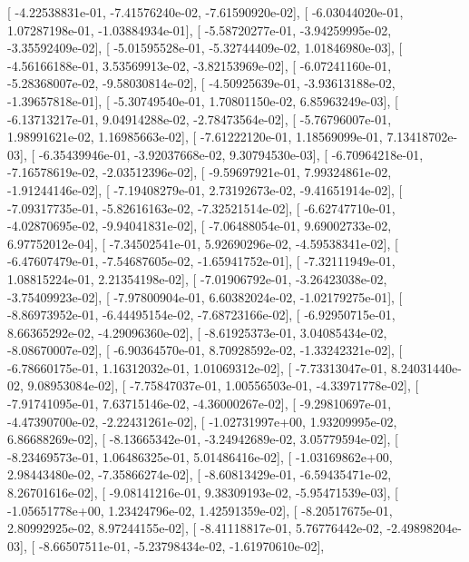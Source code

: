 \documentclass{article}
\begin{document}
       [ -4.22538831e-01,  -7.41576240e-02,  -7.61590920e-02],
       [ -6.03044020e-01,   1.07287198e-01,  -1.03884934e-01],
       [ -5.58720277e-01,  -3.94259995e-02,  -3.35592409e-02],
       [ -5.01595528e-01,  -5.32744409e-02,   1.01846980e-03],
       [ -4.56166188e-01,   3.53569913e-02,  -3.82153969e-02],
       [ -6.07241160e-01,  -5.28368007e-02,  -9.58030814e-02],
       [ -4.50925639e-01,  -3.93613188e-02,  -1.39657818e-01],
       [ -5.30749540e-01,   1.70801150e-02,   6.85963249e-03],
       [ -6.13713217e-01,   9.04914288e-02,  -2.78473564e-02],
       [ -5.76796007e-01,   1.98991621e-02,   1.16985663e-02],
       [ -7.61222120e-01,   1.18569099e-01,   7.13418702e-03],
       [ -6.35439946e-01,  -3.92037668e-02,   9.30794530e-03],
       [ -6.70964218e-01,  -7.16578619e-02,  -2.03512396e-02],
       [ -9.59697921e-01,   7.99324861e-02,  -1.91244146e-02],
       [ -7.19408279e-01,   2.73192673e-02,  -9.41651914e-02],
       [ -7.09317735e-01,  -5.82616163e-02,  -7.32521514e-02],
       [ -6.62747710e-01,  -4.02870695e-02,  -9.94041831e-02],
       [ -7.06488054e-01,   9.69002733e-02,   6.97752012e-04],
       [ -7.34502541e-01,   5.92690296e-02,  -4.59538341e-02],
       [ -6.47607479e-01,  -7.54687605e-02,  -1.65941752e-01],
       [ -7.32111949e-01,   1.08815224e-01,   2.21354198e-02],
       [ -7.01906792e-01,  -3.26423038e-02,  -3.75409923e-02],
       [ -7.97800904e-01,   6.60382024e-02,  -1.02179275e-01],
       [ -8.86973952e-01,  -6.44495154e-02,  -7.68723166e-02],
       [ -6.92950715e-01,   8.66365292e-02,  -4.29096360e-02],
       [ -8.61925373e-01,   3.04085434e-02,  -8.08670007e-02],
       [ -6.90364570e-01,   8.70928592e-02,  -1.33242321e-02],
       [ -6.78660175e-01,   1.16312032e-01,   1.01069312e-02],
       [ -7.73313047e-01,   8.24031440e-02,   9.08953084e-02],
       [ -7.75847037e-01,   1.00556503e-01,  -4.33971778e-02],
       [ -7.91741095e-01,   7.63715146e-02,  -4.36000267e-02],
       [ -9.29810697e-01,  -4.47390700e-02,  -2.22431261e-02],
       [ -1.02731997e+00,   1.93209995e-02,   6.86688269e-02],
       [ -8.13665342e-01,  -3.24942689e-02,   3.05779594e-02],
       [ -8.23469573e-01,   1.06486325e-01,   5.01486416e-02],
       [ -1.03169862e+00,   2.98443480e-02,  -7.35866274e-02],
       [ -8.60813429e-01,  -6.59435471e-02,   8.26701616e-02],
       [ -9.08141216e-01,   9.38309193e-02,  -5.95471539e-03],
       [ -1.05651778e+00,   1.23424796e-02,   1.42591359e-02],
       [ -8.20517675e-01,   2.80992925e-02,   8.97244155e-02],
       [ -8.41118817e-01,   5.76776442e-02,  -2.49898204e-03],
       [ -8.66507511e-01,  -5.23798434e-02,  -1.61970610e-02],
\end{document}
